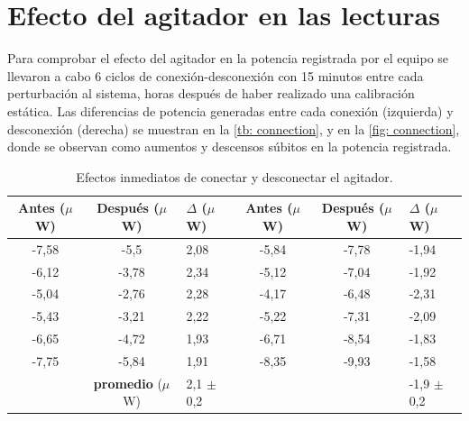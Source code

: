 	\section{Efecto del agitador en las lecturas}
	Para comprobar el efecto del agitador en la potencia registrada por el equipo se llevaron a cabo 6 ciclos de conexión-desconexión con 15 minutos entre cada perturbación al sistema, horas después de haber realizado una calibración estática. Las diferencias de potencia generadas entre cada conexión (izquierda) y desconexión (derecha) se muestran en la \autoref{tb: connection}, y en la \autoref{fig: connection}, donde se observan como aumentos y descensos súbitos en la potencia registrada.
	\begin{table}[h]
		\centering
		\caption{Efectos inmediatos de conectar y desconectar el agitador.}
		\begin{tabular}{cc|l|cc|l}
			\hline
			\textbf{Antes ($\mu$W)} & \textbf{Después ($\mu$W)} &  $\Delta$ ($\mu$W) &  \textbf{Antes ($\mu$W)} & \textbf{Después ($\mu$W)} &  $\Delta$ ($\mu$W) \\
			\hline
			-7,58 & -5,5 & 2,08 & -5,84 & -7,78 & -1,94 \\
			-6,12 & -3,78 & 2,34 & -5,12 & -7,04 & -1,92 \\
			-5,04 & -2,76 & 2,28 & -4,17 & -6,48 & -2,31 \\
			-5,43 & -3,21 & 2,22 & -5,22 & -7,31 & -2,09 \\
			-6,65 & -4,72 & 1,93 & -6,71 & -8,54 & -1,83 \\
			-7,75 & -5,84 & 1,91 & -8,35 & -9,93 & -1,58 \\
			\hline
			 & \textbf{promedio} ($\mu$W) & 2,1 $\pm$ 0,2 & & & -1,9 $\pm$ 0,2 \\
			\hline
		\end{tabular}
		\label{tb: connection}
	\end{table}

